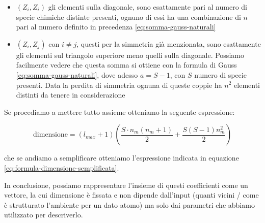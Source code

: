 \documentclass[a4paper,11pt,openany]{book}
\begin{document}
\begin{itemize}
    \item[-] $(Z_i,Z_i)$ gli elementi sulla diagonale, sono esattamente pari al numero di specie chimiche distinte presenti, ognuno di essi ha una combinazione di $n$ pari al numero definito in precedenza \eqref{eq:somma-gauss-naturali}
    
    \item[-] $(Z_i,Z_j)$ con $i \neq j$, questi per la simmetria già menzionata, sono esattamente gli elementi sul triangolo superiore meno quelli sulla diagonale. Possiamo facilmente vedere che questa somma si ottiene con la formula di Gauss \eqref{eq:somma-gauss-naturali}, dove adesso $a = S - 1$, con $S$ numero di specie presenti. Data la perdita di simmetria ognuna di queste coppie ha $n^2$ elementi distinti da tenere in considerazione
\end{itemize}

Se procediamo a mettere tutto assieme otteniamo la seguente espressione:

\begin{equation}
    \mathrm{dimensione} = (l_{max} + 1) \left( \frac{S\cdot n_{m}(n_m + 1)}{2} + \frac{S(S-1)n_m^2}{2} \right)
\end{equation}

che se andiamo a semplificare otteniamo l'espressione indicata in equazione \eqref{eq:formula-dimensione-semplificata}.

In conclusione, possiamo rappresentare l'insieme di questi coefficienti come un vettore, la cui dimensione è fissata e non dipende dall'input (quanti vicini / come è strutturato l'ambiente per un dato atomo) ma solo dai parametri che abbiamo utilizzato per descriverlo.



\backmatter %
    
   \printbibliography
    
\end{document}
